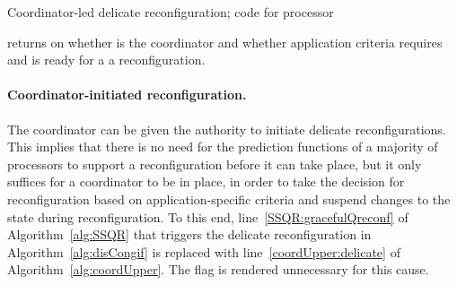 \documentclass[11pt]{article}
\begin{document}
\begingroup
\LinesNumberedHidden
\begin{algorithm}[t!]

\caption{Coordinator-led delicate reconfiguration; code for processor }
\label{alg:coordUpper}

\begin{footnotesize}

 
 returns  on whether  is the coordinator and whether application criteria requires and is ready for a  a reconfiguration.
\label{coordUpper:interfaces}

\vspace{.3em}

 \uElseIf{\label{coordUpper:delicate}}{
}


\end{footnotesize}
\end{algorithm}
\endgroup





\paragraph{Coordinator-initiated reconfiguration.}
The coordinator can be given the authority to initiate delicate reconfigurations.
This implies that there is no need for the prediction functions of a majority of processors to support a reconfiguration before it can take place, but it only suffices for a coordinator to be in place, in order to take the decision for reconfiguration based on application-specific criteria and suspend changes to the state during reconfiguration. To this end, line~\ref{SSQR:gracefulQreconf} of Algorithm~\ref{alg:SSQR} that triggers the delicate reconfiguration in Algorithm~\ref{alg:disCongif} is replaced with line~\ref{coordUpper:delicate} of Algorithm~\ref{alg:coordUpper}.
The  flag is rendered unnecessary for this cause.
\end{document}
